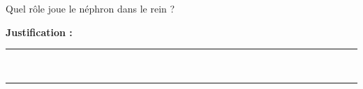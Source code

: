 Quel rôle joue le néphron dans le rein ?

\choices

\noindent\textbf{Justification :} \hrulefill \\[2.5ex]
\rule{\linewidth}{0.4pt} \\[2.5ex]
\rule{\linewidth}{0.4pt}
\vfill
